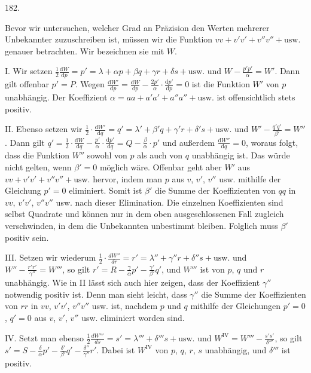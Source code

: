 \begin{center}\hypertarget{native-254-article182}{}182.\end{center}
Bevor wir untersuchen, welcher Grad an Präzision den Werten mehrerer Unbekannter zuzuschreiben ist, müssen wir die Funktion $vv+v'v'+v''v''+\text{usw.}$ genauer betrachten. Wir bezeichnen sie mit $W$.

I. Wir setzen $\tfrac12\frac{\mathrm{d}W}{\mathrm{d}p}=p'
=\lambda+\alpha p+\beta q+\gamma r+\delta s+\text{usw.}$ und $W-\frac{p'p'}{\alpha}=W'$. Dann gilt offenbar $p'=P$. Wegen $\frac{\mathrm{d}W'}{\mathrm{d}p}=\frac{\mathrm{d}W}{\mathrm{d}p}
-\frac{2p'}{\alpha}\cdot\frac{\mathrm{d}p'}{\mathrm{d}p}=0$ ist die Funktion $W'$ von $p$ unabhängig. Der Koeffizient $\alpha=aa+a'a'+a''a''+\text{usw.}$ ist offensichtlich stets positiv.

II. Ebenso setzen wir $\tfrac12\cdot\frac{\mathrm{d}W'}{\mathrm{d}q}=q'
=\lambda'+\beta'q+\gamma'r+\delta's+\text{usw.}$ und $W'-\frac{q'q'}{\beta'}=W''$. Dann gilt $q'=\tfrac12\cdot\frac{\mathrm{d}W}{\mathrm{d}q}
-\frac{p'}{\alpha}\cdot\frac{\mathrm{d}p'}{\mathrm{d}q}
=Q-\frac{\beta}{\alpha}\cdot p'$ und außerdem $\frac{\mathrm{d}W''}{\mathrm{d}q}=0$, woraus folgt, dass die Funktion $W''$ sowohl von $p$ als auch von $q$ unabhängig ist. Das würde nicht gelten, wenn $\beta'=0$ möglich wäre. Offenbar geht aber $W'$ aus $vv+v'v'+v''v''+\text{usw.}$ hervor, indem man $p$ aus $v$, $v'$, $v''$ usw. mithilfe der Gleichung $p'=0$ eliminiert. Somit ist $\beta'$ die Summe der Koeffizienten von $qq$ in $vv$, $v'v'$, $v''v''$ usw. nach dieser Elimination. Die einzelnen Koeffizienten sind selbst Quadrate und können nur in dem oben ausgeschlossenen Fall zugleich verschwinden, in dem die Unbekannten unbestimmt bleiben. Folglich muss $\beta'$ positiv sein.

III. Setzen wir wiederum $\tfrac12\cdot\frac{dW''}{dr}=r'
=\lambda''+\gamma''r+\delta''s+\text{usw.}$ und $W''-\frac{r'r'}{\gamma''}=W'''$, so gilt $r'=R-\frac{\gamma}{\alpha}p'-\frac{\gamma'}{\beta'}q'$, und $W'''$ ist von $p$, $q$ und $r$ unabhängig. Wie in II lässt sich auch hier zeigen, dass der Koeffizient $\gamma''$ notwendig positiv ist. Denn man sieht leicht, dass $\gamma''$ die Summe der Koeffizienten von $rr$ in $vv$, $v'v'$, $v''v''$ usw. ist, nachdem $p$ und $q$ mithilfe der Gleichungen $p'=0$, $q'=0$ aus $v$, $v'$, $v''$ usw. eliminiert worden sind.

IV. Setzt man ebenso $\tfrac12\frac{dW'''}{ds}=s'
=\lambda'''+\delta'''s+\text{usw.}$ und $W^{\mathrm{IV}}=W'''-\frac{s's'}{\delta'''}$, so gilt $s'=S-\frac{\delta}{\alpha}p'-\frac{\delta'}{\beta'}q'-\frac{\delta''}{\gamma''}r'$. Dabei ist $W^{\mathrm{IV}}$ von $p$, $q$, $r$, $s$ unabhängig, und $\delta'''$ ist positiv.

